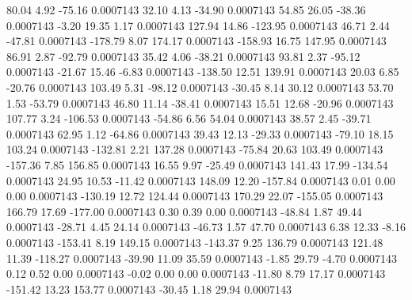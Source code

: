        80.04        4.92      -75.16     0.0007143
       32.10        4.13      -34.90     0.0007143
       54.85       26.05      -38.36     0.0007143
       -3.20       19.35        1.17     0.0007143
      127.94       14.86     -123.95     0.0007143
       46.71        2.44      -47.81     0.0007143
     -178.79        8.07      174.17     0.0007143
     -158.93       16.75      147.95     0.0007143
       86.91        2.87      -92.79     0.0007143
       35.42        4.06      -38.21     0.0007143
       93.81        2.37      -95.12     0.0007143
      -21.67       15.46       -6.83     0.0007143
     -138.50       12.51      139.91     0.0007143
       20.03        6.85      -20.76     0.0007143
      103.49        5.31      -98.12     0.0007143
      -30.45        8.14       30.12     0.0007143
       53.70        1.53      -53.79     0.0007143
       46.80       11.14      -38.41     0.0007143
       15.51       12.68      -20.96     0.0007143
      107.77        3.24     -106.53     0.0007143
      -54.86        6.56       54.04     0.0007143
       38.57        2.45      -39.71     0.0007143
       62.95        1.12      -64.86     0.0007143
       39.43       12.13      -29.33     0.0007143
      -79.10       18.15      103.24     0.0007143
     -132.81        2.21      137.28     0.0007143
      -75.84       20.63      103.49     0.0007143
     -157.36        7.85      156.85     0.0007143
       16.55        9.97      -25.49     0.0007143
      141.43       17.99     -134.54     0.0007143
       24.95       10.53      -11.42     0.0007143
      148.09       12.20     -157.84     0.0007143
        0.01        0.00        0.00     0.0007143
     -130.19       12.72      124.44     0.0007143
      170.29       22.07     -155.05     0.0007143
      166.79       17.69     -177.00     0.0007143
        0.30        0.39        0.00     0.0007143
      -48.84        1.87       49.44     0.0007143
      -28.71        4.45       24.14     0.0007143
      -46.73        1.57       47.70     0.0007143
        6.38       12.33       -8.16     0.0007143
     -153.41        8.19      149.15     0.0007143
     -143.37        9.25      136.79     0.0007143
      121.48       11.39     -118.27     0.0007143
      -39.90       11.09       35.59     0.0007143
       -1.85       29.79       -4.70     0.0007143
        0.12        0.52        0.00     0.0007143
       -0.02        0.00        0.00     0.0007143
      -11.80        8.79       17.17     0.0007143
     -151.42       13.23      153.77     0.0007143
      -30.45        1.18       29.94     0.0007143

